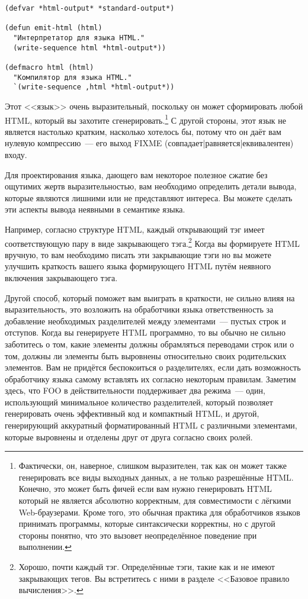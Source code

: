 \begin{lstlisting}
(defvar *html-output* *standard-output*)

(defun emit-html (html)
  "Интерпретатор для языка HTML."
  (write-sequence html *html-output*))

(defmacro html (html)
  "Компилятор для языка HTML."
  `(write-sequence ,html *html-output*))
\end{lstlisting}

Этот <<язык>> очень выразительный, поскольку он может сформировать любой HTML, который вы
захотите сгенерировать.\footnote{Фактически, он, наверное, слишком выразителен, так как он
  может также генерировать все виды выходных данных, а не только разрешённые
  HTML. Конечно, это может быть фичей если вам нужно генерировать HTML который не является
  абсолютно корректным, для совместимости с лёгкими Web-браузерами. Кроме того, это
  обычная практика для обработчиков языков принимать программы, которые синтаксически
  корректны, но с другой стороны понятно, что это вызовет неопределённое поведение при
  выполнении.} С другой стороны, этот язык не является настолько кратким, насколько
хотелось бы, потому что он даёт вам нулевую компрессию~--- его выход FIXME
(совпадает|равняется|еквивалентен) входу.

Для проектирования языка, дающего вам некоторое полезное сжатие без ощутимих жертв
выразительностью, вам необходимо определить детали вывода, которые являются лишними или не
представляют интереса. Вы можете сделать эти аспекты вывода неявными в семантике языка.

Например, согласно структуре HTML, каждый открывающий тэг имеет соответствующую пару в
виде закрывающего тэга.\footnote{Хорошо, почти каждый тэг. Определённые тэги, такие как
   и  не имеют закрывающих тегов.  Вы встретитесь с ними в разделе
  <<Базовое правило вычисления>>.} Когда вы формируете HTML вручную, то вам необходимо
писать эти закрывающие тэги но вы можете улучшить краткость вашего языка формирующего HTML
путём неявного включения закрывающего тэга.

Другой способ, который поможет вам выиграть в краткости, не сильно влияя на
выразительность, это возложить на обработчики языка ответственность за добавление
необходимых разделителей между элементами~--- пустых строк и отступов. Когда вы генерируете
HTML программно, то вы обычно не сильно заботитесь о том, какие элементы должны
обрамляться переводами строк или о том, должны ли элементы быть выровнены относительно
своих родительских элементов. Вам не придётся беспокоиться о разделителях, если дать
возможность обработчику языка самому вставлять их согласно некоторым правилам. Заметим
здесь, что FOO в действительности поддерживает два режима~--- один, использующий
минимальное количество разделителей, который позволяет генерировать очень эффективный код
и компактный HTML, и другой, генерирующий аккуратный форматированный HTML с различными
элементами, которые выровнены и отделены друг от друга согласно своих ролей.

